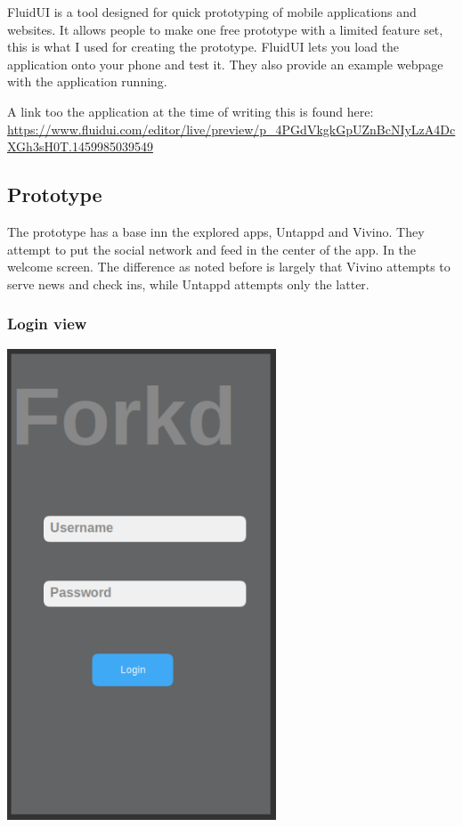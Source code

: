 \documentclass[12pt]{article}
\begin{document}
FluidUI is a tool designed for quick prototyping of mobile applications and
websites. It allows people to make one free prototype with a limited feature
set, this is what I used for creating the prototype. FluidUI lets you load the
application onto your phone and test it. They also provide an example webpage
with the application running.

A link too the application at the time of writing this is found here:
\url{https://www.fluidui.com/editor/live/preview/p_4PGdVkgkGpUZnBcNIyLzA4DcXGh3sH0T.1459985039549}


\subsection{Prototype}
The prototype has a base inn the explored apps, Untappd and Vivino. They
attempt to put the social network and feed in the center of the app. In the
welcome screen. The difference as noted before is largely that Vivino attempts
to serve news and check ins, while Untappd attempts only the latter.


\subsubsection{Login view}
\includegraphics[width=8cm]{pictures/prototype/login}
\bigbreak
\end{document}
